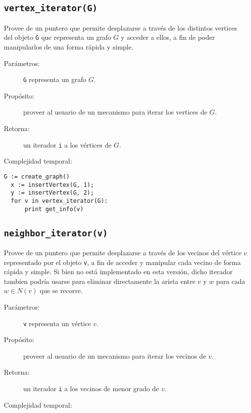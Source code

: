 \documentclass[%
    a4paper,%
    12pt,%
    twoside,%
    openright,%
    halfparskip,%
    cleardoubleempty,%
    bigheadings,%
    titlepage,%
    headsepline%
]{scrbook}
\makeatletter
\newcommand{\Code}[1]{\lstinline[basicstyle={\tt}]@#1@}
\makeatother
\begin{document}
\subsection{\Code{vertex_iterator(G)}}%
\label{sec:tad grafo:vertex-iterator}

Provee de un puntero que permite desplazarse a través de los distintos vertices del objeto \texttt{G} que representa un grafo $G$ y acceder a ellos, a fin de poder manipularlos de una forma rápida y simple.

\begin{description}
  \item [Parámetros:] \Code{G} representa un grafo $G$.
  \item [Propósito:] proveer al usuario de un mecanismo para iterar los vertices de $G$.
  \item [Retorna:] un iterador \Code{i} a los vértices de $G$.
  \item [Complejidad temporal:]
\end{description}


\begin{lstlisting}[caption={Ejemplo de uso de \Code{vertex_iterator}. El código crea un grafo $G$ con el vertice 1 y el vertice 2. Luego, mediante el iterador de $G$ se recorre sus vertices y el ciclo imprime ``12''.},gobble=2,float=ht,label={lst:pseudo:vertex_iterator},emph={vertex_iterator}]
  G := create_graph()
  x := insertVertex(G, 1);
  y := insertVertex(G, 2);
  for v in vertex_iterator(G):
      print get_info(v)
\end{lstlisting}


\subsection{\Code{neighbor_iterator(v)}}%
\label{sec:tad grafo:neighbor-iterator}

Provee de un puntero que permite desplazarse a través de los vecinos del vértice $v$ representado por el objeto \texttt{v}, a fin de acceder y manipular cada vecino de forma rápida y simple.  Si bien no está implementado en esta versión, dicho iterador tambien podría usarse para eliminar directamente la arista entre $v$ y $w$ para cada $w \in N(v)$ que se recorre.

\begin{description}
  \item [Parámetros:] \Code{v} representa un vértice $v$.
  \item [Propósito:] proveer al usuario de un mecanismo para iterar los vecinos de $v$.
  \item [Retorna:] un iterador \Code{i} a los vecinos de menor grado de $v$.
  \item [Complejidad temporal:]
\end{description}
\end{document}

